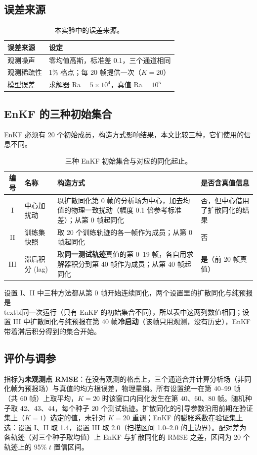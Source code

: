 \documentclass[10.5pt,a4paper]{article}
\begin{document}
\subsection{误差来源}
\begin{table}[H]\centering\small\caption{本实验中的误差来源。}
\begin{tabular}{p{2.2cm}p{9.2cm}}\toprule
误差来源 & 设定\\\midrule
观测噪声 & 零均值高斯，标准差 0.1，三个通道相同\\
观测稀疏性 & 1\% 格点；每 20 帧提供一次（$K=20$）\\
模型误差 & 求解器 Ra$=5\times10^4$，真值 Ra$=10^5$\\\bottomrule
\end{tabular}\end{table}

\subsection{EnKF 的三种初始集合}
EnKF 必须有 20 个初始成员，构造方式影响结果，本文比较三种，它们使用的信息不同。
\begin{table}[H]\centering\small\caption{三种 EnKF 初始集合与对应的同化起止。}
\begin{tabular}{clp{5.6cm}p{3.1cm}}\toprule
编号 & 名称 & 构造方式 & 是否含真值信息\\\midrule
I & 中心加扰动 & 以扩散同化第 0 帧的分析场为中心，加去均值的物理一致扰动（幅度 0.1 倍参考标准差）；从第 0 帧起同化 & 否，但中心借用了扩散同化的结果\\
II & 训练集快照 & 取 20 个训练轨迹的各一帧作为成员；从第 0 帧起同化 & 否\\
III & 滞后积分 (lag) & 取\textbf{同一测试轨迹}真值的第 0--19 帧，各自用求解器积分到第 40 帧作为成员；从第 40 帧起同化 & \textbf{是}（前 20 帧真值）\\\bottomrule
\end{tabular}\end{table}
设置 I、II 中三种方法都从第 0 帧开始连续同化，两个设置里的扩散同化与纯预报是\\textbf{同一次运行}（只有 EnKF 的初始集合不同），所以表中这两列数值相同；设置 III 中扩散同化与纯预报在第 40 帧\textbf{冷启动}（该帧只用观测，没有历史），EnKF 带着滞后积分得到的集合开始。

\subsection{评价与调参}
指标为\textbf{未观测点 RMSE}：在没有观测的格点上，三个通道合并计算分析场（非同化帧为预报场）与真值的均方根误差，物理量纲。所有设置统一在第 40--99 帧（共 60 帧）上取平均，$K=20$ 时该窗口内同化发生在第 40、60、80 帧。随机种子取 42、43、44，每个种子 20 个测试轨迹。扩散同化的引导参数沿用前期在验证集上（$K=1$）选定的值，未针对 $K=20$ 重调；EnKF 的膨胀系数在验证集上选：设置 I、II 取 1.4，设置 III 取 2.0（扫描区间 1.0--2.0 的上边界）。配对差为各轨迹（对三个种子取均值）上 EnKF 与扩散同化的 RMSE 之差，区间为 20 个轨迹上的 95\% $t$ 置信区间。
\end{document}

